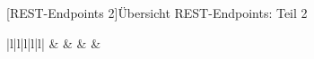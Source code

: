 [REST-Endpoints 2]{Übersicht REST-Endpoints: Teil 2}	
\label{table:endpoints2}
\begin{table}
	\centering
	\begin{tabular}{|l|l|l|l|l|}
		\hline
		 &                                                   &                                                                   &  &                                                                           \\ \hline
		

\end{tabular}
\end{table}
